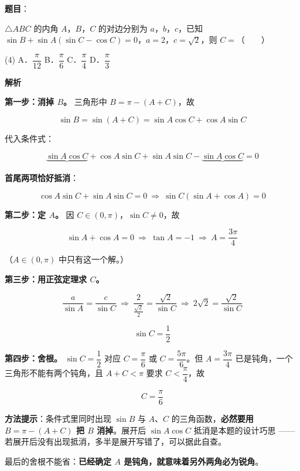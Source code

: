 \begin{answer}

\textbf{题目}：

$\triangle ABC$ 的内角 $A$，$B$，$C$ 的对边分别为 $a$，$b$，$c$，已知 $\sin B+\sin A(\sin C-\cos C)=0$，$a=2$，$c=\sqrt2$，则 $C=$\mbox{（　　）}

\begin{gkopts}(4)
\task A．$\dfrac\pi{12}$
\task B．$\dfrac\pi6$
\task C．$\dfrac\pi4$
\task D．$\dfrac\pi3$
\end{gkopts}

\textbf{解析}

\textbf{第一步：消掉 $B$。} 三角形中 $B=\pi-(A+C)$，故

\nopagebreak[4]
\[\sin B=\sin(A+C)=\sin A\cos C+\cos A\sin C\]

代入条件式：

\nopagebreak[4]
\[\underbrace{\sin A\cos C}_{}+\cos A\sin C+\sin A\sin C-\underbrace{\sin A\cos C}_{}=0\]

\textbf{首尾两项恰好抵消}：

\nopagebreak[4]
\[\cos A\sin C+\sin A\sin C=0\ \Longrightarrow\ \sin C\left(\sin A+\cos A\right)=0\]

\textbf{第二步：定 $A$。} 因 $C\in(0,\pi)$，$\sin C\ne0$，故

\nopagebreak[4]
\[\sin A+\cos A=0\ \Longrightarrow\ \tan A=-1\ \Longrightarrow\ A=\frac{3\pi}4\]

（$A\in(0,\pi)$ 中只有这一个解。）

\textbf{第三步：用正弦定理求 $C$。}

\nopagebreak[4]
\[\frac a{\sin A}=\frac c{\sin C}\ \Longrightarrow\ \frac2{\frac{\sqrt2}2}=\frac{\sqrt2}{\sin C}\ \Longrightarrow\ 2\sqrt2=\frac{\sqrt2}{\sin C}\]

\nopagebreak[4]
\[\sin C=\frac12\]

\textbf{第四步：舍根。} $\sin C=\dfrac12$ 对应 $C=\dfrac\pi6$ 或 $C=\dfrac{5\pi}6$。但 $A=\dfrac{3\pi}4$ 已是钝角，一个三角形不能有两个钝角，且 $A+C<\pi$ 要求 $C<\dfrac\pi4$，故

\nopagebreak[4]
\[C=\frac\pi6\]

\begin{gktip}
\textbf{方法提示}：条件式里同时出现 $\sin B$ 与 $A$、$C$ 的三角函数，\textbf{必然要用 $B=\pi-(A+C)$ 把 $B$ 消掉}。展开后 $\sin A\cos C$ 抵消是本题的设计巧思 —— 若展开后没有出现抵消，多半是展开写错了，可以据此自查。

最后的舍根不能省：\textbf{已经确定 $A$ 是钝角，就意味着另外两角必为锐角}。
\end{gktip}


\par\medskip

\end{answer}
